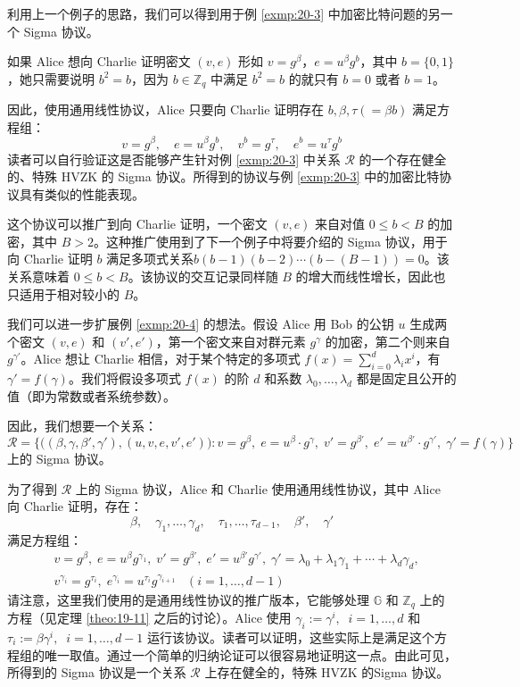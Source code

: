 \begin{example}[加密后的比特 2]\label{exmp:20-5}
利用上一个例子的思路，我们可以得到用于例 \ref{exmp:20-3} 中加密比特问题的另一个 Sigma 协议。

如果 Alice 想向 Charlie 证明密文 $(v,e)$ 形如 $v=g^\beta$，$e=u^\beta g^b$，其中 $b=\{0,1\}$，她只需要说明 $b^2=b$，因为 $b\in\mathbb{Z}_q$ 中满足 $b^2=b$ 的就只有 $b=0$ 或者 $b=1$。

因此，使用通用线性协议，Alice 只要向 Charlie 证明存在 $b,\beta,\tau(=\beta b)$ 满足方程组：
\[
v=g^\beta,
\quad
e=u^\beta g^b,
\quad
v^b=g^\tau,
\quad
e^b=u^\tau g^b
\]
读者可以自行验证这是否能够产生针对例 \ref{exmp:20-3} 中关系 $\mathcal R$ 的一个存在健全的、特殊 HVZK 的 Sigma 协议。所得到的协议与例 \ref{exmp:20-3} 中的加密比特协议具有类似的性能表现。

这个协议可以推广到向 Charlie 证明，一个密文 $(v,e)$ 来自对值 $0\leq b < B$ 的加密，其中 $B>2$。这种推广使用到了下一个例子中将要介绍的 Sigma 协议，用于向 Charlie 证明 $b$ 满足多项式关系$b(b-1)(b-2)\cdots(b-(B-1))=0$。该关系意味着 $0\leq b < B$。该协议的交互记录同样随 $B$ 的增大而线性增长，因此也只适用于相对较小的 $B$。
\end{example}

\begin{example}[多项式关系]\label{exmp:20-6}
我们可以进一步扩展例 \ref{exmp:20-4} 的想法。假设 Alice 用 Bob 的公钥 $u$ 生成两个密文 $(v,e)$ 和 $(v',e')$，第一个密文来自对群元素 $g^\gamma$ 的加密，第二个则来自 $g^{\gamma'}$。Alice 想让 Charlie 相信，对于某个特定的多项式 $f(x)=\sum_{i=0}^d\lambda_ix^i$，有 $\gamma'=f(\gamma)$。我们将假设多项式 $f(x)$ 的阶 $d$ 和系数 $\lambda_0,\dots,\lambda_d$ 都是固定且公开的值（即为常数或者系统参数）。

因此，我们想要一个关系：
\[
\mathcal R=
\bigg\lbrace
\Big((\beta,\gamma,\beta',\gamma'),(u,v,e,v',e')\Big):
v=g^\beta,\;
e=u^\beta\cdot g^\gamma,\;
v'=g^{\beta'},\;
e'=u^{\beta'}\cdot g^{\gamma'},\;
\gamma'=f(\gamma)
\bigg\rbrace
\]
上的 Sigma 协议。

为了得到 $\mathcal R$ 上的 Sigma 协议，Alice 和 Charlie 使用通用线性协议，其中 Alice 向 Charlie 证明，存在：
\[
\beta,
\quad
\gamma_1,\dots,\gamma_d,
\quad
\tau_1,\dots,\tau_{d-1},
\quad
\beta',
\quad
\gamma'
\]
满足方程组：
\begin{equation*}
\begin{aligned}
& v=g^\beta,\;
e=u^\beta g^{\gamma_1},\;
v'=g^{\beta'},\;
e'=u^{\beta'}g^{\gamma'},\;
\gamma'=\lambda_0+\lambda_1\gamma_1+\cdots+\lambda_d\gamma_d,\\
& v^{\gamma_i}=g^{\tau_i},\;
e^{\gamma_i}=u^{\tau_i}g^{\gamma_{i+1}}\;\;\;
(i=1,\dots,d-1)
\end{aligned}
\end{equation*}
请注意，这里我们使用的是通用线性协议的推广版本，它能够处理 $\mathbb G$ 和 $\mathbb{Z}_q$ 上的方程（见定理 \ref{theo:19-11} 之后的讨论）。Alice 使用 $\gamma_i:=\gamma^i,\;\;i=1,\dots,d$ 和 $\tau_i:=\beta\gamma^i,\;\;i=1,\dots,d-1$ 运行该协议。读者可以证明，这些实际上是满足这个方程组的唯一取值。通过一个简单的归纳论证可以很容易地证明这一点。由此可见，所得到的 Sigma 协议是一个关系 $\mathcal R$ 上存在健全的，特殊 HVZK 的Sigma 协议。
\end{example}

